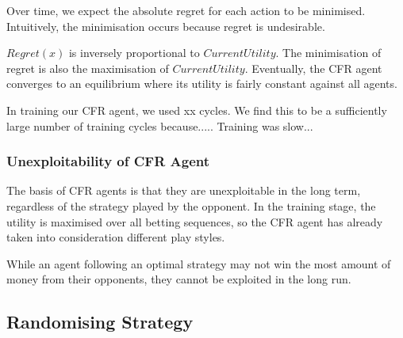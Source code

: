 \documentclass{article}
\begin{document}
Over time, we expect the absolute regret for each action to be minimised. Intuitively, the minimisation occurs because regret is undesirable. 



$Regret(x)$ is inversely proportional to $CurrentUtility$. The minimisation of regret is also the maximisation of $CurrentUtility$. Eventually, the CFR agent converges to an equilibrium where its utility is fairly constant against all agents.

In training our CFR agent, we used xx cycles. We find this to be a sufficiently large number of training cycles because..... Training was slow...

\subsubsection{Unexploitability of CFR Agent}

The basis of CFR agents is that they are unexploitable in the long term, regardless of the strategy played by the opponent. In the training stage, the utility is maximised over all betting sequences, so the CFR agent has already taken into consideration different play styles.


While an agent following an optimal strategy may not win the most amount of money from their opponents, they cannot be exploited in the long run. 

\subsection{Randomising Strategy}
\end{document}
